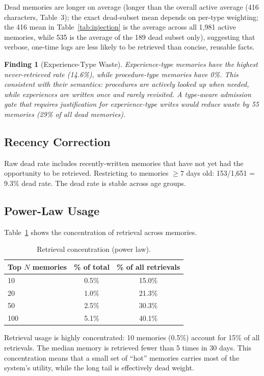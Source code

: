 \documentclass{llncs}
\newtheorem{finding}{Finding}
\begin{document}
Dead memories are longer on average (longer than the overall active average (416 characters, Table~3); the exact dead-subset mean depends on per-type weighting; the 416 mean in Table~\ref{tab:injection} is the average across all 1,981 active memories, while 535 is the average of the 189 dead subset only), suggesting that verbose, one-time logs are less likely to be retrieved than concise, reusable facts.

\begin{finding}[Experience-Type Waste]
Experience-type memories have the highest never-retrieved rate (14.6\%), while procedure-type memories have 0\%. This consistent with their semantics: procedures are actively looked up when needed, while experiences are written once and rarely revisited. A type-aware admission gate that requires justification for experience-type writes would reduce waste by 55 memories (29\% of all dead memories).
\end{finding}

\subsection{Recency Correction}

Raw dead rate includes recently-written memories that have not yet had the opportunity to be retrieved. Restricting to memories $\geq 7$ days old: 153/1,651 = 9.3\% dead rate. The dead rate is stable across age groups.

\subsection{Power-Law Usage}


Table~\ref{tab:powerlaw} shows the concentration of retrieval across memories.

\begin{table}[h]
\centering
\caption{Retrieval concentration (power law).}
\label{tab:powerlaw}
\begin{tabular}{lcc}
\toprule
Top $N$ memories & \% of total & \% of all retrievals \\
\midrule
10 & 0.5\% & 15.0\% \\
20 & 1.0\% & 21.3\% \\
50 & 2.5\% & 30.3\% \\
100 & 5.1\% & 40.1\% \\
\bottomrule
\end{tabular}
\end{table}

Retrieval usage is highly concentrated: 10 memories (0.5\%) account for 15\% of all retrievals. The median memory is retrieved fewer than 5 times in 30 days. This concentration means that a small set of ``hot'' memories carries most of the system's utility, while the long tail is effectively dead weight.
\end{document}

